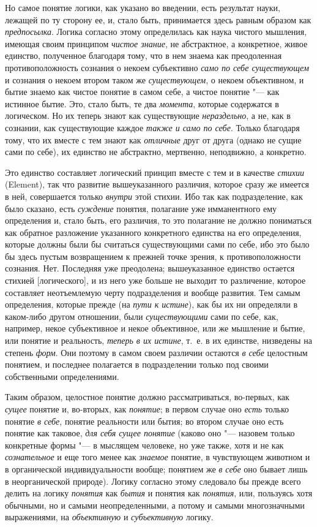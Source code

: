 Но самое понятие логики, как указано во введении, есть результат науки,
лежащей по ту сторону ее, и, стало быть, принимается здесь равным образом
как {\em предпосылка}. Логика согласно этому
определилась как наука чистого мышления, имеющая своим принципом
{\em чистое знание}, не абстрактное, а конкретное,
живое единство, полученное благодаря тому, что в нем знаема как
преодоленная противоположность сознания о некоем субъективно
{\em само по себе существующем} и сознания о некоем
втором таком же {\em существующем}, о некоем
объективном, и бытие знаемо как чистое понятие в самом себе, а чистое
понятие "--- как истинное бытие. Это, стало быть, те два
{\em момента}, которые содержатся в логическом. Но их теперь знают как
существующие {\em нераздельно}, а
не, как в сознании, как существующие каждое {\em также
и само по себе}. Только благодаря тому, что их вместе с тем знают как
{\em отличные} друг от друга (однако не сущие сами по
себе), их единство не абстрактно, мертвенно, неподвижно, а конкретно.

Это единство составляет логический принцип вместе с тем и в качестве
{\em стихии} (Element), так что развитие вышеуказанного
различия, которое сразу же имеется в ней, совершается только
{\em внутри} этой стихии. Ибо так как подразделение,
как было сказано, есть {\em суждение} понятия,
полагание уже имманентного ему определения и, стало быть, его различия, то
это полагание не должно пониматься как обратное разложение указанного
конкретного единства на его определения, которые должны были бы считаться
существующими сами по себе, ибо это было бы здесь пустым возвращением к
прежней точке зрения, к противоположности сознания. Нет. Последняя уже
преодолена; вышеуказанное единство остается стихией [логического], и из
него уже больше не выходит то различение, которое составляет неотъемлемую
черту подразделения и вообще развития. Тем самым определения, которые
прежде (на {\em пути к истине}), как бы их ни
определяли в каком-либо другом отношении, были
{\em существующими} сами по себе, как, например, некое
субъективное и некое объективное, или же мышление и бытие, или понятие и
реальность, {\em теперь в их истине}, т.~е. в их
единстве, низведены на степень {\em форм}. Они поэтому
в самом своем различии остаются {\em в себе} целостным
понятием, и последнее полагается в подразделении только под своими
собственными определениями.

Таким образом, целостное понятие должно рассматриваться, во-первых, как
{\em сущее} понятие и, во-вторых, как {\em понятие}; в первом случае оно
{\em есть} только понятие {\em в
себе}, понятие реальности или бытия; во втором случае оно есть понятие как
таковое, {\em для себя сущее понятие} (каково оно
"--- назовем только конкретные формы "--- в мыслящем человеке,
но уже также, хотя и не как {\em сознательное} и еще того менее как
{\em знаемое} понятие, в чувствующем животном и в
органической индивидуальности вообще; понятием же
{\em в себе} оно бывает лишь в неорганической природе).
Логику согласно этому следовало бы прежде всего делить на логику
{\em понятия} как {\em бытия} и понятия как {\em понятия}, или, пользуясь
хотя обычными, но и самыми неопределенными, а потому и самыми многозначными
выражениями, на {\em объективную} и {\em субъективную} логику.

